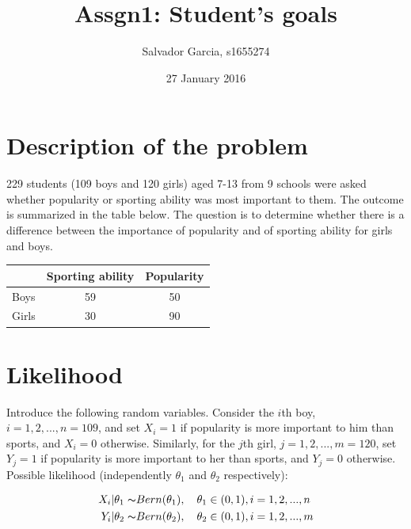\documentclass{article}
\author{Salvador Garcia, s1655274}
\date{27 January 2016}
\title{Assgn1: Student's goals}
\begin{document}
\maketitle

\section{Description of the problem} 

229 students (109 boys and 120 girls) aged 7-13 from 9 schools were asked whether popularity or sporting ability was most important to them. The outcome is summarized in
the table below. The question is to determine whether there is a difference between the
importance of popularity and of sporting ability for girls and boys.

\begin{table}[h]
\centering
\begin{tabular}{l|cc|}
\cline{2-3}
                            & \multicolumn{1}{l|}{Sporting ability} & \multicolumn{1}{l|}{Popularity} \\ \hline
\multicolumn{1}{|l|}{Boys}  & 59                                    & 50                              \\
\multicolumn{1}{|l|}{Girls} & 30                                    & 90                              \\ \hline
\end{tabular}
\end{table}

\section{Likelihood}  
Introduce the following random variables. Consider the $i$th boy, $i = 1,2, ..., n = 109$, and set $X_i = 1$ if popularity is more important to him than sports, and $X_i = 0$ otherwise. Similarly, for the $j$th girl, $j = 1,2, ...,m = 120$, set $Y_j = 1$ if popularity is more important to her than sports, and $Y_j=0$ otherwise.
Possible likelihood (independently $\theta_1$ and $\theta_2$ respectively):

\begin{equation}
\begin{split}
X_i | \theta_1  \thicksim& Bern(\theta_1),\quad \theta_1 \in (0,1), i = 1,2,...,n\\
Y_i | \theta_2  \thicksim& Bern(\theta_2),\quad \theta_2 \in (0,1), i = 1,2,...,m
\end{split}
\end{equation}
\end{document}
